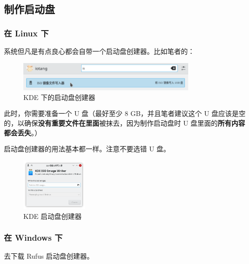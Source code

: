 \documentclass[UTF-8]{ctexart}
\begin{document}
		\subsection{制作启动盘}
		
			\subsubsection{在 Linux 下}
			
				系统但凡是有点良心都会自带一个启动盘创建器。比如笔者的：
			
				\begin{figure}[H]
					\centering
					\includegraphics[width=0.8\textwidth]{fig/iso_burn.png}
					\caption*{KDE 下的启动盘创建器}
				\end{figure}
				
				此时，你需要准备一个 U 盘（最好至少 8 GB，并且笔者建议这个 U 盘应该是空的，以确保\textbf{\large 没有重要文件在里面}被抹去，因为制作启动盘时 U 盘里面的\textbf{\large 所有内容都会丢失}。）
				
				启动盘创建器的用法基本都一样。注意不要选错 U 盘。
			
				\begin{figure}[H]
					\centering
					\includegraphics[width=0.3\textwidth]{fig/isoimagewriter.png}
					\caption*{KDE 启动盘创建器}
				\end{figure}


			\subsubsection{在 Windows 下}
			
				去下载 Rufus 启动盘创建器。
				
\end{document}
